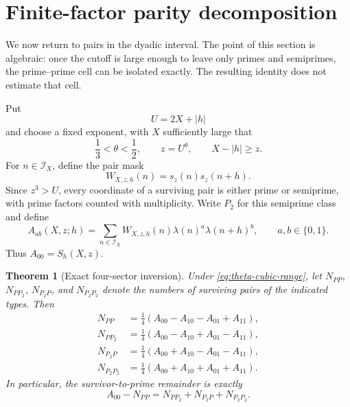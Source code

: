 \documentclass[11pt]{article}
\newtheorem{theorem}{Theorem}[section]
\theoremstyle{definition}
\theoremstyle{remark}
\newcommand{\cI}{\mathcal I}
\begin{document}
\section{Finite-factor parity decomposition}\label{sec:tomography}

We now return to pairs in the dyadic interval.  The point of this section is algebraic: once the cutoff is large enough to leave only primes and semiprimes, the prime--prime cell can be isolated exactly.  The resulting identity does not estimate that cell.

Put
\begin{equation}\label{eq:tomography-U}
 U=2X+|h|
\end{equation}
and choose a fixed exponent, with $X$ sufficiently large that
\begin{equation}\label{eq:theta-cubic-range}
 \frac13<\theta<\frac12,
 \qquad z=U^\theta,
 \qquad X-|h|\ge z.
\end{equation}
For $n\in\cI_X$, define the pair mask
\begin{equation}\label{eq:pair-mask-W}
 W_{X,z,h}(n)=s_z(n)s_z(n+h).
\end{equation}
Since $z^3>U$, every coordinate of a surviving pair is either prime or semiprime, with prime factors counted with multiplicity.  Write $P_2$ for this semiprime class and define
\begin{equation}\label{eq:walsh-moments}
 A_{ab}(X,z;h)=
 \sum_{n\in\cI_X}W_{X,z,h}(n)
 \lambda(n)^a\lambda(n+h)^b,
 \qquad a,b\in\{0,1\}.
\end{equation}
Thus $A_{00}=S_h(X,z)$.

\begin{theorem}[Exact four-sector inversion]\label{thm:four-sector-inversion}
Under \eqref{eq:theta-cubic-range}, let $N_{PP}$, $N_{P P_2}$, $N_{P_2P}$, and $N_{P_2P_2}$ denote the numbers of surviving pairs of the indicated types.  Then
\begin{align}
 N_{PP}&=\frac14(A_{00}-A_{10}-A_{01}+A_{11}),\label{eq:sector-PP}\\
 N_{P P_2}&=\frac14(A_{00}-A_{10}+A_{01}-A_{11}),\label{eq:sector-PS}\\
 N_{P_2P}&=\frac14(A_{00}+A_{10}-A_{01}-A_{11}),\label{eq:sector-SP}\\
 N_{P_2P_2}&=\frac14(A_{00}+A_{10}+A_{01}+A_{11}).\label{eq:sector-SS}
\end{align}
In particular, the survivor-to-prime remainder is exactly
\begin{equation}\label{eq:survivor-to-prime-remainder}
 A_{00}-N_{PP}=N_{P P_2}+N_{P_2P}+N_{P_2P_2}.
\end{equation}
\end{theorem}
\end{document}
